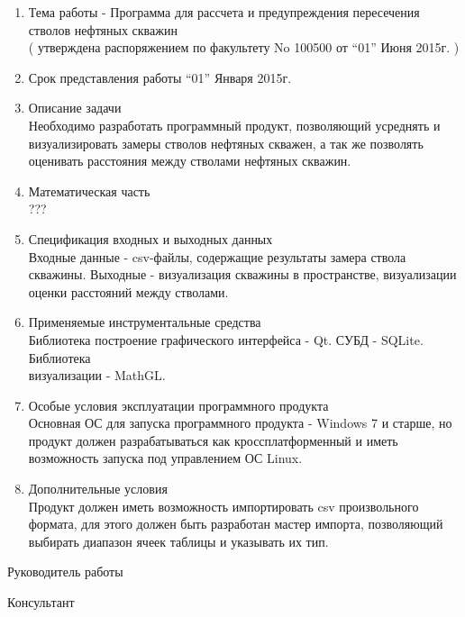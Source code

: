 \begin{titlepage}
\begin{enumerate}
  \item Тема работы - Программа для рассчета и предупреждения пересечения стволов нефтяных скважин\\
  ( утверждена распоряжением по факультету No 100500 от “01” Июня 2015г. )
  \item Срок представления работы “01” Января 2015г.
  \item Описание задачи\\
    Необходимо разработать программный продукт, позволяющий усреднять и визуализировать замеры стволов нефтяных скважен, а так же
    позволять оценивать расстояния между стволами нефтяных скважин.
  \item Математическая часть\\
  ???
  \item Спецификация входных и выходных данных\\
  Входные данные - csv-файлы, содержащие результаты замера ствола скважины. Выходные - визуализация скважины в пространстве, визуализации оценки расстояний
  между стволами.
  \item Применяемые инструментальные средства\\
  Библиотека построение графического интерфейса - Qt. СУБД - SQLite. Библиотека\\визуализации - MathGL.
  \item Особые условия эксплуатации программного продукта\\
  Основная ОС для запуска программного продукта - Windows 7 и старше, но продукт должен разрабатываться как кроссплатформенный и иметь возможность запуска
  под управлением ОС Linux.
  \item Дополнительные условия\\
  Продукт должен иметь возможность импортировать csv произвольного формата, для этого должен быть разработан мастер импорта, позволяющий
  выбирать диапазон ячеек таблицы и указывать их тип.
\end{enumerate}

\vspace{\fill}

Руководитель работы \underline{\hspace{5cm}}

Консультант \underline{\hspace{6.5cm}}
\end{titlepage}
